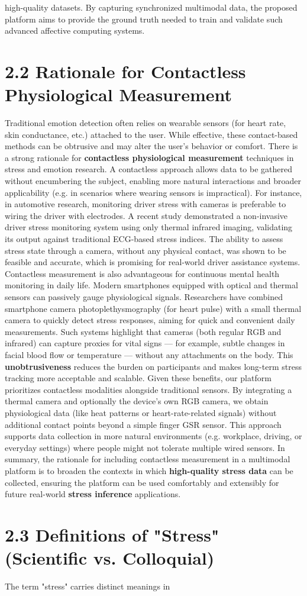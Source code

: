 high-quality datasets. By capturing synchronized multimodal data, the proposed platform aims to provide the ground truth needed to train and validate such advanced affective computing systems. \section{2.2 Rationale for Contactless Physiological Measurement} Traditional emotion detection often relies on wearable sensors (for heart rate, skin conductance, etc.) attached to the user. While effective, these contact-based methods can be obtrusive and may alter the user's behavior or comfort. There is a strong rationale for \textbf{contactless physiological measurement} techniques in stress and emotion research. A contactless approach allows data to be gathered without encumbering the subject, enabling more natural interactions and broader applicability (e.g. in scenarios where wearing sensors is impractical). For instance, in automotive research, monitoring driver stress with cameras is preferable to wiring the driver with electrodes. A recent study demonstrated a non-invasive driver stress monitoring system using only thermal infrared imaging, validating its output against traditional ECG-based stress indices. The ability to assess stress state through a camera, without any physical contact, was shown to be feasible and accurate, which is promising for real-world driver assistance systems. Contactless measurement is also advantageous for continuous mental health monitoring in daily life. Modern smartphones equipped with optical and thermal sensors can passively gauge physiological signals. Researchers have combined smartphone camera photoplethysmography (for heart pulse) with a small thermal camera to quickly detect stress responses, aiming for quick and convenient daily measurements. Such systems highlight that cameras (both regular RGB and infrared) can capture proxies for vital signs --- for example, subtle changes in facial blood flow or temperature --- without any attachments on the body. This \textbf{unobtrusiveness} reduces the burden on participants and makes long-term stress tracking more acceptable and scalable. Given these benefits, our platform prioritizes contactless modalities alongside traditional sensors. By integrating a thermal camera and optionally the device's own RGB camera, we obtain physiological data (like heat patterns or heart-rate-related signals) without additional contact points beyond a simple finger GSR sensor. This approach supports data collection in more natural environments (e.g. workplace, driving, or everyday settings) where people might not tolerate multiple wired sensors. In summary, the rationale for including contactless measurement in a multimodal platform is to broaden the contexts in which \textbf{high-quality stress data} can be collected, ensuring the platform can be used comfortably and extensibly for future real-world \textbf{stress inference} applications. \section{2.3 Definitions of "Stress" (Scientific vs. Colloquial)} The term "stress" carries distinct meanings in 